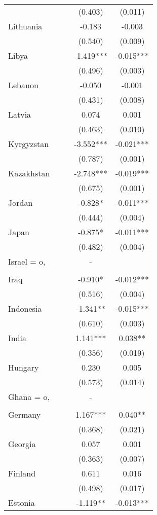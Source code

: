 \documentclass[]{article}
\begin{document}
\begin{tabular}{lcccc}
 &  &  & (0.403) & (0.011) \\
Lithuania &  &  & -0.183 & -0.003 \\
 &  &  & (0.540) & (0.009) \\
Libya &  &  & -1.419*** & -0.015*** \\
 &  &  & (0.496) & (0.003) \\
Lebanon &  &  & -0.050 & -0.001 \\
 &  &  & (0.431) & (0.008) \\
Latvia &  &  & 0.074 & 0.001 \\
 &  &  & (0.463) & (0.010) \\
Kyrgyzstan &  &  & -3.552*** & -0.021*** \\
 &  &  & (0.787) & (0.001) \\
Kazakhstan &  &  & -2.748*** & -0.019*** \\
 &  &  & (0.675) & (0.001) \\
Jordan &  &  & -0.828* & -0.011*** \\
 &  &  & (0.444) & (0.004) \\
Japan &  &  & -0.875* & -0.011*** \\
 &  &  & (0.482) & (0.004) \\
Israel = o, &  &  & - &  \\
 &  &  &  &  \\
Iraq &  &  & -0.910* & -0.012*** \\
 &  &  & (0.516) & (0.004) \\
Indonesia &  &  & -1.341** & -0.015*** \\
 &  &  & (0.610) & (0.003) \\
India &  &  & 1.141*** & 0.038** \\
 &  &  & (0.356) & (0.019) \\
Hungary &  &  & 0.230 & 0.005 \\
 &  &  & (0.573) & (0.014) \\
Ghana = o, &  &  & - &  \\
 &  &  &  &  \\
Germany &  &  & 1.167*** & 0.040** \\
 &  &  & (0.368) & (0.021) \\
Georgia &  &  & 0.057 & 0.001 \\
 &  &  & (0.363) & (0.007) \\
Finland &  &  & 0.611 & 0.016 \\
 &  &  & (0.498) & (0.017) \\
Estonia &  &  & -1.119** & -0.013*** \\

\end{tabular}
\end{document}
